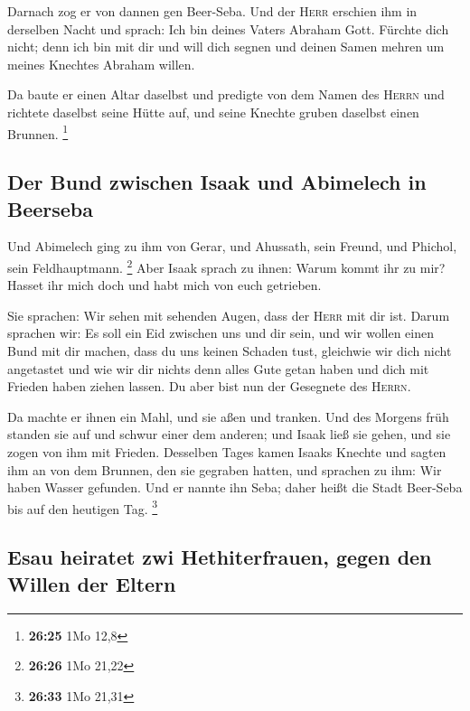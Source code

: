  Darnach zog er von dannen gen Beer-Seba. 
Und der \textsc{Herr} erschien ihm in derselben Nacht und sprach: Ich
bin deines Vaters Abraham Gott. Fürchte dich nicht; denn ich bin mit dir
und will dich segnen und deinen Samen mehren um meines Knechtes Abraham
willen.

 Da baute er einen Altar daselbst und predigte von dem
Namen des \textsc{Herrn} und richtete daselbst seine Hütte auf, und
seine Knechte gruben daselbst einen Brunnen. \footnote{\textbf{26:25}
  1Mo 12,8}

\hypertarget{der-bund-zwischen-isaak-und-abimelech-in-beerseba}{%
\subsection{Der Bund zwischen Isaak und Abimelech in
Beerseba}\label{der-bund-zwischen-isaak-und-abimelech-in-beerseba}}

 Und Abimelech ging zu ihm von Gerar, und Ahussath, sein
Freund, und Phichol, sein Feldhauptmann. \footnote{\textbf{26:26} 1Mo
  21,22}  Aber Isaak sprach zu ihnen: Warum kommt ihr zu
mir? Hasset ihr mich doch und habt mich von euch getrieben.

 Sie sprachen: Wir sehen mit sehenden Augen, dass der
\textsc{Herr} mit dir ist. Darum sprachen wir: Es soll ein Eid zwischen
uns und dir sein, und wir wollen einen Bund mit dir machen,
 dass du uns keinen Schaden tust, gleichwie wir dich
nicht angetastet und wie wir dir nichts denn alles Gute getan haben und
dich mit Frieden haben ziehen lassen. Du aber bist nun der Gesegnete des
\textsc{Herrn}.

 Da machte er ihnen ein Mahl, und sie aßen und tranken.
 Und des Morgens früh standen sie auf und schwur einer
dem anderen; und Isaak ließ sie gehen, und sie zogen von ihm mit
Frieden.  Desselben Tages kamen Isaaks Knechte und sagten
ihm an von dem Brunnen, den sie gegraben hatten, und sprachen zu ihm:
Wir haben Wasser gefunden.  Und er nannte ihn Seba; daher
heißt die Stadt Beer-Seba bis auf den heutigen Tag. \footnote{\textbf{26:33}
  1Mo 21,31}

\hypertarget{esau-heiratet-zwi-hethiterfrauen-gegen-den-willen-der-eltern}{%
\subsection{Esau heiratet zwi Hethiterfrauen, gegen den Willen der
Eltern}\label{esau-heiratet-zwi-hethiterfrauen-gegen-den-willen-der-eltern}}


